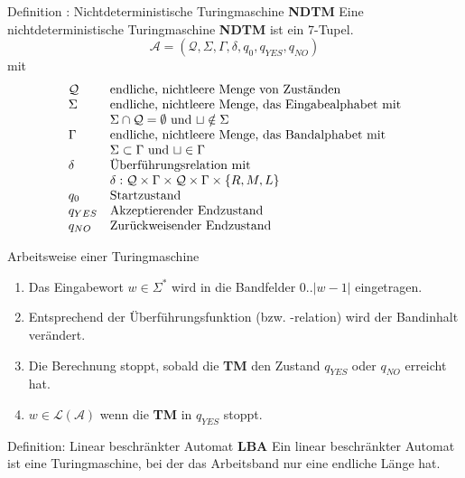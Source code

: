 \documentclass[]{beamer}
\begin{document}
\begin{frame}[squeeze]{}
  \begin{block}{Definition : Nichtdeterministische Turingmaschine \textbf{NDTM}}
    Eine nichtdeterministische Turingmaschine \textbf{NDTM} ist ein 7-Tupel.
    \[\mathcal{A} = \left( \mathcal{Q}, \Sigma, \Gamma, \delta, q_0, q_{YES}, q_{NO} \right)\]
    mit
    \[\begin{array}{l l}
        \mathcal{Q} & \text{endliche, nichtleere Menge von Zuständen} \\
        \Sigma      & \text{endliche, nichtleere Menge, das Eingabealphabet mit} \\
                    & \Sigma \cap \mathcal{Q} = \emptyset \text{ und } \sqcup \notin \Sigma \\
        \Gamma      & \text{endliche, nichtleere Menge, das Bandalphabet mit} \\
                    & \Sigma \subset \Gamma \text{ und } \sqcup \in \Gamma \\
        \delta      & \text{Überführungsrelation mit } \\
                    & \delta : \mathcal{Q} \times \Gamma \times \mathcal{Q} \times \Gamma \times \{R, M, L\}\\
        q_0         & \text{Startzustand} \\
        q_{YES}     & \text{Akzeptierender Endzustand} \\
        q_{NO}      & \text{Zurückweisender Endzustand}\\
      \end{array}\]
  \end{block}
\end{frame}

\begin{frame}[squeeze]{}
  \begin{block}{Arbeitsweise einer Turingmaschine}
    \begin{enumerate}
      \item Das Eingabewort $w \in \Sigma^*$ wird in die Bandfelder $0 .. |w-1|$ eingetragen.
      \item Entsprechend der Überführungsfunktion (bzw. -relation) wird der Bandinhalt verändert.
      \item Die Berechnung stoppt, sobald die \textbf{TM} den Zustand $q_{YES}$ oder $q_{NO}$ erreicht hat.
      \item $w \in \mathcal{L(A)}$ wenn die \textbf{TM} in $q_{YES}$ stoppt.
    \end{enumerate}
  \end{block}
  
  \pause
  
  \begin{block}{Definition: Linear beschränkter Automat \textbf{LBA}}
    Ein linear beschränkter Automat ist eine Turingmaschine, bei der das Arbeitsband nur eine endliche Länge hat.
  \end{block}
\end{frame}
\end{document}

